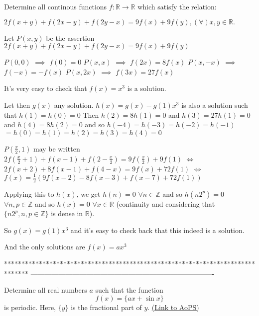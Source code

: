 \begin{solution}
	\begin{tcolorbox}Determine all continous functions $ f: \mathbb{R} \rightarrow \mathbb{R}$ which satisfy the relation:

$ 2f(x + y) + f(2x - y) + f(2y - x) = 9f(x) + 9f(y), (\forall) x,y \in \mathbb{R}.$\end{tcolorbox}

Let $ P(x,y)$ be the assertion $ 2f(x + y) + f(2x - y) + f(2y - x) = 9f(x) + 9f(y)$

$ P(0,0)$ $ \implies$ $ f(0) = 0$
$ P(x,x)$ $ \implies$ $ f(2x) = 8f(x)$
$ P(x,-x)$ $ \implies$ $ f(-x)=-f(x)$
$ P(x,2x)$ $ \implies$ $ f(3x) = 27f(x)$

It's very easy to check that $ f(x) = x^3$ is a solution.

Let then $ g(x)$ any solution. $ h(x) = g(x) - g(1)x^3$ is also a solution such that $ h(1) = h(0) = 0$
Then $ h(2) = 8h(1) = 0$ and $ h(3) = 27h(1) = 0$ and $ h(4) = 8h(2) = 0$ and so $ h( - 4) = h( - 3) = h( - 2) = h( - 1)$ $ = h(0) = h(1) = h(2) = h(3) = h(4) = 0$

$ P(\frac x2,1)$ may be written $ 2f(\frac x2 + 1) + f(x - 1) + f(2 - \frac x2) = 9f(\frac x2) + 9f(1)$
$ \iff$ $ 2f(x + 2) + 8f(x - 1) + f(4 - x) = 9f(x) + 72f(1)$
$ \iff$ $ f(x) = \frac 12(9f(x - 2) - 8f(x - 3) + f(x - 7) + 72f(1))$

Applying this to $ h(x)$, we get $ h(n) = 0$ $ \forall n\in\mathbb Z$ and so $ h(n2^p) = 0$ $ \forall n,p\in\mathbb Z$ and so $ h(x) = 0$ $ \forall x\in\mathbb R$ (continuity and considering that $ \{n2^p,n,p\in\mathbb Z\}$ is dense in $ \mathbb R$).

So $ g(x) = g(1)x^3$ and it's easy to check back that this indeed is a solution.

And the only solutions are $ \boxed{f(x) = ax^3}$
\end{solution}
*******************************************************************************
-------------------------------------------------------------------------------

\begin{problem}
	Determine all real numbers $a$ such that the function \[ f(x) =\{ ax + \sin x\}\] is periodic. Here, $\{y\}$ is the fractional part of $y$.
	\flushright \href{https://artofproblemsolving.com/community/c6h307480}{(Link to AoPS)}
\end{problem}



